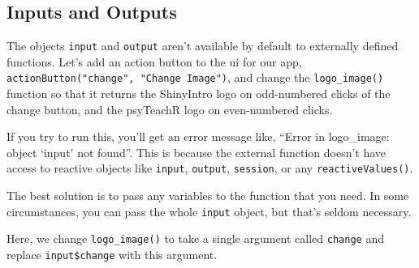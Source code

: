 \documentclass[
]{book}
\newenvironment{Shaded}{\begin{snugshade}}{\end{snugshade}}
\newcommand{\AttributeTok}[1]{\textcolor[rgb]{0.77,0.63,0.00}{#1}}
\newcommand{\ControlFlowTok}[1]{\textcolor[rgb]{0.13,0.29,0.53}{\textbf{#1}}}
\newcommand{\DecValTok}[1]{\textcolor[rgb]{0.00,0.00,0.81}{#1}}
\newcommand{\FunctionTok}[1]{\textcolor[rgb]{0.00,0.00,0.00}{#1}}
\newcommand{\NormalTok}[1]{#1}
\newcommand{\OtherTok}[1]{\textcolor[rgb]{0.56,0.35,0.01}{#1}}
\newcommand{\SpecialCharTok}[1]{\textcolor[rgb]{0.00,0.00,0.00}{#1}}
\newcommand{\StringTok}[1]{\textcolor[rgb]{0.31,0.60,0.02}{#1}}
\begin{document}
\hypertarget{inputs-and-outputs}{%
\subsection{Inputs and Outputs}\label{inputs-and-outputs}}

The objects \texttt{input} and \texttt{output} aren't available by default to externally defined functions. Let's add an action button to the ui for our app, \texttt{actionButton("change",\ "Change\ Image")}, and change the \texttt{logo\_image()} function so that it returns the ShinyIntro logo on odd-numbered clicks of the change button, and the psyTeachR logo on even-numbered clicks.

\begin{Shaded}
\end{Shaded}

If you try to run this, you'll get an error message like, ``Error in logo\_image: object `input' not found''. This is because the external function doesn't have access to reactive objects like \texttt{input}, \texttt{output}, \texttt{session}, or any \texttt{reactiveValues()}.

The best solution is to pass any variables to the function that you need. In some circumstances, you can pass the whole \texttt{input} object, but that's seldom necessary.

Here, we change \texttt{logo\_image()} to take a single argument called \texttt{change} and replace \texttt{input\$change} with this argument.
\end{document}
